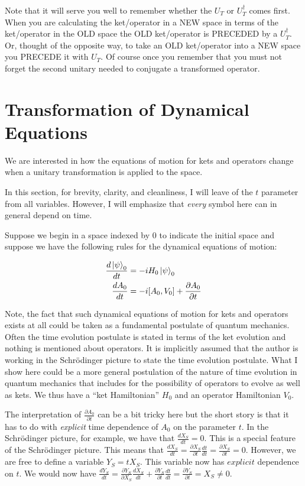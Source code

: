\documentclass[12pt]{article}
\newcommand{\ddt}[1]{\frac{d #1}{dt}}
\begin{document}
Note that it will serve you well to remember whether the $U_T$ or $U_T^{\dag}$ comes first. When you are calculating the ket/operator in a NEW space in terms of the ket/operator in the OLD space the OLD ket/operator is PRECEDED by a $U_T^{\dag}$. Or, thought of the opposite way, to take an OLD ket/operator into a NEW space you PRECEDE it with $U_T$. Of course once you remember that you must not forget the second unitary needed to conjugate a transformed operator.

\section{Transformation of Dynamical Equations}

We are interested in how the equations of motion for kets and operators change when a unitary transformation is applied to the space. 

In this section, for brevity, clarity, and cleanliness, I will leave of the $t$ parameter from all variables. However, I will emphasize that \emph{every} symbol here can in general depend on time.

Suppose we begin in a space indexed by $0$ to indicate the initial space and suppose we have the following rules for the dynamical equations of motion:

\begin{align}
\ddt{\ket{\psi}_0} &= -i H_0 \ket{\psi}_0\\
\ddt{A_0} &= -i[A_0,V_0] + \frac{\partial A_0}{\partial t}
\end{align}

Note, the fact that such dynamical equations of motion for kets and operators exists at all could be taken as a fundamental postulate of quantum mechanics. Often the time evolution postulate is stated in terms of the ket evolution and nothing is mentioned about operators. It is implicitly assumed that the author is working in the Schr{\"o}dinger picture to state the time evolution postulate. What I show here could be a more general postulation of the nature of time evolution in quantum mechanics that includes for the possibility of operators to evolve as well as kets. We thus have a ``ket Hamiltonian'' $H_0$ and an operator Hamiltonian $V_0$.

The interpretation of $\frac{\partial A_0}{\partial t}$ can be a bit tricky here but the short story is that it has to do with \textit{explicit} time dependence of $A_0$ on the parameter $t$. In the Schr{\"o}dinger picture, for example, we have that $\ddt{X_S} = 0$. This is a special feature of the Schr{\"o}dinger picture. This means that $\ddt{X_S} = \frac{\partial X_S}{\partial t} \ddt{t} = \frac{\partial X_S}{\partial t} =  0$. However, we are free to define a variable $Y_S = t X_S$. This variable now has $\textit{explicit}$ dependence on $t$. We would now have $\ddt{Y_S} = \frac{\partial{Y_S}}{\partial X_S} \ddt{X_S} + \frac{\partial{Y_S}}{\partial t} \ddt{t} = \frac{\partial Y_S}{\partial t}= X_S \neq 0$.
\end{document}
